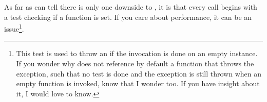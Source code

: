 As far as can tell there is only one downside to ,
it is that every call begins with a test checking if a function is
set. If you care about performance, it can be an issue\footnote{This
  test is used to throw an  if the
  invocation is done on an empty instance. If you wonder why
   does not reference by default a function that
  throws the exception, such that no test is done and the exception is
  still thrown when an empty function is invoked, know that I wonder
  too. If you have insight about it, I would love to know.}.
